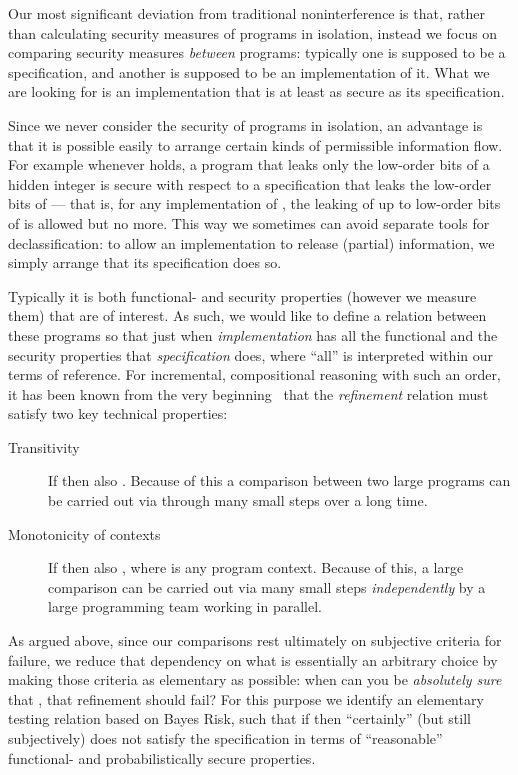 \documentclass[runningheads]{llncs}
\begin{document}
Our most significant deviation from traditional noninterference is that, rather than calculating security measures of programs in isolation, instead we focus on comparing security measures \emph{between} programs: typically one is supposed to be a specification, and another is supposed to be an implementation of it. What we are looking for is an implementation that is at least as secure as its specification. 

Since we never consider the security of programs in isolation, an advantage is that it is possible easily to arrange certain kinds of permissible information flow. For example whenever  holds, a program  that leaks only the  low-order bits of a hidden integer  is secure with respect to a specification  that leaks the  low-order bits of  --- that is, for any implementation of , the leaking of up to  low-order bits of  is allowed but no more. This way we sometimes can avoid separate tools for declassification: to allow an implementation to release (partial) information, we simply arrange that its specification does so.

Typically it is both functional- and security properties (however we measure them) that are of interest. As such, we would like to define a relation  between these programs so that  just when \emph{implementation}  has all the functional and the security properties that \emph{specification}  does, where ``all'' is interpreted within our terms of reference. For incremental, compositional reasoning with such an order, it has been known from the very beginning~\cite{Wirth:71} that the \emph{refinement} relation  must satisfy two key technical properties:
\begin{description}
\item[Transitivity] If  then also . Because of this a comparison between two large programs  can be carried out via  through many small steps over a long time.
\item[Monotonicity of contexts] If  then also , where  is any program context. Because of this, a large comparison can be carried out via many small steps \emph{independently} by a large programming team working in parallel. 
\end{description}
As argued above, since our comparisons rest ultimately on subjective criteria for failure, we reduce that dependency on what is essentially an arbitrary choice by making those criteria as elementary as possible: when can you be \emph{absolutely sure} that , that refinement should fail? For this purpose we identify an elementary testing relation  based on Bayes Risk, such that if  then  ``certainly'' (but still subjectively) does not satisfy the specification  in terms of ``reasonable'' functional- and probabilistically secure properties. 
\end{document}
